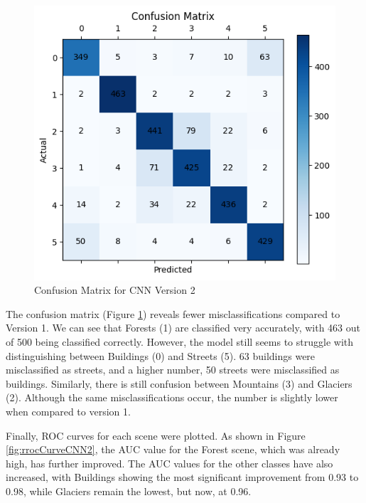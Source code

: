 \documentclass[conference]{IEEEtran}
\begin{document}
\begin{figure}[H]
    \centering
    \includegraphics[width=0.8\linewidth]{images/confusion_matrix_cnn_2.png}
    \caption{Confusion Matrix for CNN Version 2}
    \label{fig:confusionMatrixCNN2}
\end{figure}

The confusion matrix (Figure \ref{fig:confusionMatrixCNN2}) reveals fewer misclassifications compared to Version 1. We can see that Forests (1) are classified very accurately, with 463 out of 500 being classified correctly. However, the model still seems to struggle with distinguishing between Buildings (0) and Streets (5). 63 buildings were misclassified as streets, and a higher number, 50 streets were misclassified as buildings. Similarly, there is still confusion between Mountains (3) and Glaciers (2). Although the same misclassifications occur, the number is slightly lower when compared to version 1.

Finally, ROC curves for each scene were plotted. As shown in Figure \ref{fig:rrocCurveCNN2}, the AUC value for the Forest scene, which was already high, has further improved. The AUC values for the other classes have also increased, with Buildings showing the most significant improvement from 0.93 to 0.98, while Glaciers remain the lowest, but now, at 0.96.
\end{document}
